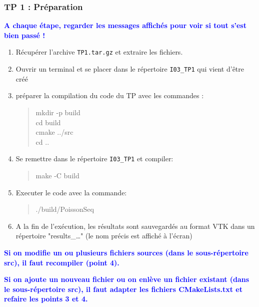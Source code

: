 \documentclass{beamer}
\begin{document}
\begin{frame}
	\frametitle{TP 1 : Pr\'eparation}
	
	\vfill
	\textcolor{blue}{\bf A chaque \'etape, regarder les messages affich\'es pour voir si tout s'est bien pass\'e !}
	\vfill

	\begin{enumerate}
		\item R\'ecup\'erer l'archive {\tt TP1.tar.gz} et extraire les fichiers.
		\item Ouvrir un terminal et se placer dans le r\'epertoire {\tt I03\_TP1} qui vient d'\^etre cr\'e\'e
		\item préparer la compilation du code du TP avec les commandes :
		\begin{quote}
			mkdir -p build\\
			cd build\\
			cmake ../src\\
			cd ..
		\end{quote}
		\item Se remettre dans le r\'epertoire {\tt I03\_TP1} et compiler:
		\begin{quote}
			make -C build
		\end{quote}
	\end{enumerate}
	\vfill
	
\end{frame}
\begin{frame}
	\begin{enumerate}
  		\setcounter{enumi}{4}
		\item Executer le code avec la commande:
		\begin{quote}
			./build/PoissonSeq
		\end{quote}
		\item A la fin de l'exécution, les résultats sont sauvegardés au format VTK dans un répertoire "results\_\ldots" (le nom précis est affiché à l'écran)
	\end{enumerate}

\vfill
\textcolor{blue}{\bf Si on modifie un ou plusieurs fichiers sources (dans le sous-r\'epertoire src), il faut recompiler (point 4).}
\vfill

\textcolor{blue}{\bf Si on ajoute un nouveau fichier ou on enl\`eve un fichier existant (dans le sous-r\'epertoire src), il faut adapter les fichiers CMakeLists.txt et refaire les points 3 et 4.}
\vfill

\end{frame}
\end{document}
